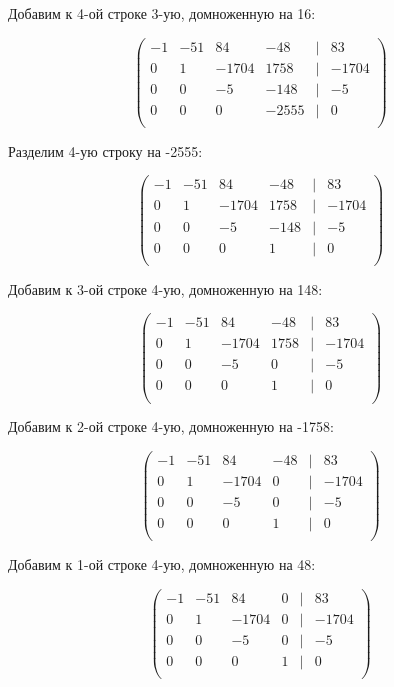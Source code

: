 	Добавим к 4-ой строке 3-ую, домноженную на 16:
	
	\[
	\begin{pmatrix}
	-1 & -51 & 84 & -48 & | & 83 \\
	0 & 1 & -1704 & 1758 & | & -1704 \\
	0 & 0 & -5 & -148 & | & -5 \\
	0 & 0 & 0 & -2555 & | & 0 \\
	\end{pmatrix}
	\]
	
	Разделим 4-ую строку на -2555:
	
	\[
	\begin{pmatrix}
	-1 & -51 & 84 & -48 & | & 83 \\
	0 & 1 & -1704 & 1758 & | & -1704 \\
	0 & 0 & -5 & -148 & | & -5 \\
	0 & 0 & 0 & 1 & | & 0 \\
	\end{pmatrix}
	\]
	
	Добавим к 3-ой строке 4-ую, домноженную на 148:
	
	\[
	\begin{pmatrix}
	-1 & -51 & 84 & -48 & | & 83 \\
	0 & 1 & -1704 & 1758 & | & -1704 \\
	0 & 0 & -5 & 0 & | & -5 \\
	0 & 0 & 0 & 1 & | & 0 \\
	\end{pmatrix}
	\]
	
	Добавим к 2-ой строке 4-ую, домноженную на -1758:
	
	\[
	\begin{pmatrix}
	-1 & -51 & 84 & -48 & | & 83 \\
	0 & 1 & -1704 & 0 & | & -1704 \\
	0 & 0 & -5 & 0 & | & -5 \\
	0 & 0 & 0 & 1 & | & 0 \\
	\end{pmatrix}
	\]
	
	Добавим к 1-ой строке 4-ую, домноженную на 48:
	
	\[
	\begin{pmatrix}
	-1 & -51 & 84 & 0 & | & 83 \\
	0 & 1 & -1704 & 0 & | & -1704 \\
	0 & 0 & -5 & 0 & | & -5 \\
	0 & 0 & 0 & 1 & | & 0 \\
	\end{pmatrix}
	\]
	
